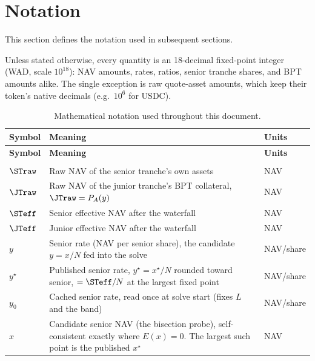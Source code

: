 \section{Notation}
\label{sec:notation}

This section defines the notation used in subsequent sections.

Unless stated otherwise, every quantity is an 18-decimal fixed-point
integer (WAD, scale $10^{18}$): NAV amounts, rates, ratios, senior
tranche shares, and BPT amounts alike. The single exception is raw
quote-asset amounts, which keep their token's native decimals (e.g.\
$10^6$ for USDC).

{\small
\setlength{\tabcolsep}{4pt}
\begin{xltabular}{\textwidth}{l X l}
  \caption{Mathematical notation used throughout this document.}
  \label{tbl:notation-math} \\
  \toprule
  \textbf{Symbol} & \textbf{Meaning} & \textbf{Units} \\
  \midrule
  \endfirsthead
  \toprule
  \textbf{Symbol} & \textbf{Meaning} & \textbf{Units} \\
  \midrule
  \endhead
  \bottomrule
  \endfoot
  \bottomrule
  \endlastfoot
   \\
  \midrule
  $\STraw$           & Raw NAV of the senior tranche's own assets                                       & NAV \\
  $\JTraw$           & Raw NAV of the junior tranche's BPT collateral, $\JTraw = P_A(y)$               & NAV \\
  $\STeff$           & Senior effective NAV after the waterfall                                         & NAV \\
  $\JTeff$           & Junior effective NAV after the waterfall                                         & NAV \\
  $y$                & Senior rate (NAV per senior share), the candidate $y = x/N$ fed into the solve  & NAV/share \\
  $y^\star$          & Published senior rate, $y^\star = x^\star/N$ rounded toward senior, $= \STeff/N$ at the largest fixed point & NAV/share \\
  $y_0$              & Cached senior rate, read once at solve start (fixes $L$ and the band)            & NAV/share \\
  $x$                & Candidate senior NAV (the bisection probe), self-consistent exactly where $E(x) = 0$. The largest such point is the published $x^\star$ & NAV \\

\end{xltabular}}
